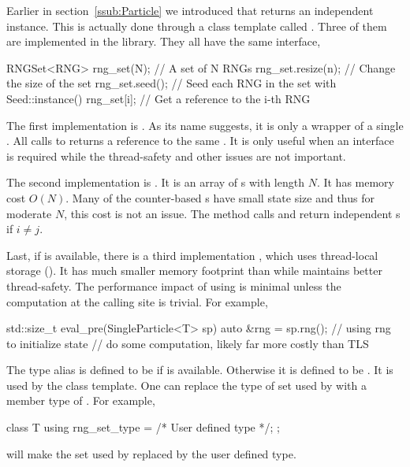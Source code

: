 Earlier in section~\ref{ssub:Particle} we introduced that
 returns an independent \rng instance. This is
actually done through a class template called . Three of them
are implemented in the library. They all have the same interface,
\begin{cppcode}
  RNGSet<RNG> rng_set(N); // A set of N RNGs
  rng_set.resize(n);      // Change the size of the set
  rng_set.seed();         // Seed each RNG in the set with Seed::instance()
  rng_set[i];             // Get a reference to the i-th RNG
\end{cppcode}
The first implementation is . As its name suggests, it
is only a wrapper of a single \rng. All calls to  returns
a reference to the same \rng. It is only useful when an 
interface is required while the thread-safety and other issues are not
important.

The second implementation is . It is an array of
\rng{}s with length $N$. It has memory cost $O(N)$. Many of the counter-based
\rng{}s have small state size and thus for moderate $N$, this cost is not an
issue. The method calls  and 
return independent \rng{}s if $i \ne j$.

Last, if \tbb is available, there is a third implementation
, which uses thread-local storage (\tls). It has much
smaller memory footprint than  while maintains better
thread-safety. The performance impact of using \tls is minimal unless the
computation at the calling site is trivial. For example,
\begin{cppcode}
  std::size_t eval_pre(SingleParticle<T> sp)
  {
    auto &rng = sp.rng();
    // using rng to initialize state
    // do some computation, likely far more costly than TLS
  }
\end{cppcode}
The type alias  is defined to be  if
\tbb is available. Otherwise it is defined to be . It
is used by the  class template. One can replace the type of
\rng set used by  with a member type of .
For example,
\begin{cppcode}
  class T
  {
    using rng_set_type = /* User defined type */;
  };
\end{cppcode}
will make the \rng set used by  replaced by the user
defined type.

